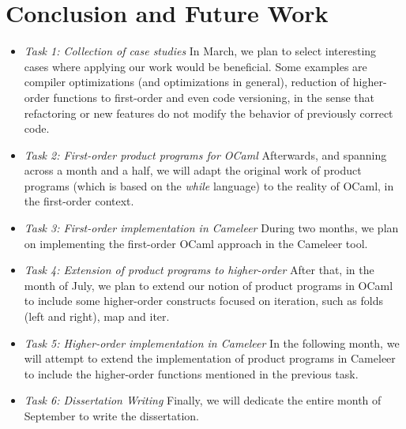 
%

\chapter{Conclusion and Future Work}
\label{cha:conclusion}

\begin{itemize}
    \setlength\itemsep{0bp}

    \item{\emph{Task 1: Collection of case studies}}\hspace{1em}
    In March, we plan to select interesting cases where applying our work would be beneficial. 
    Some examples are compiler optimizations (and optimizations in general), reduction of higher-order functions to first-order and even code versioning, in the sense that refactoring or new features do not modify the behavior of previously correct code.

    \item \emph{Task 2: First-order product programs for OCaml}\hspace{1em} 
    Afterwards, and spanning across a month and a half, we will adapt the original work of product programs (which is based on the \emph{while} language) to the reality of OCaml, in the first-order context.

    \item \emph{Task 3: First-order implementation in Cameleer}\hspace{1em} 
    During two months, we plan on implementing the first-order OCaml approach in the Cameleer tool.

    \item \emph{Task 4: Extension of product programs to higher-order}\hspace{1em} 
    After that, in the month of July, we plan to extend our notion of product programs in OCaml to include some higher-order constructs focused on iteration, such as folds (left and right), map and iter.

    \item \emph{Task 5: Higher-order implementation in Cameleer}\hspace{1em} 
    In the following month, we will attempt to extend the implementation of product programs in Cameleer to include the higher-order functions mentioned in the previous task.

    \item \emph{Task 6: Dissertation Writing}\hspace{1em} 
    Finally, we will dedicate the entire month of September to write the dissertation.

\end{itemize}
  
